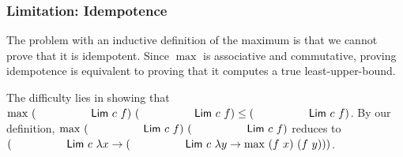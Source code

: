\begin{code}
%
\>[12]\AgdaSymbol{\{}\AgdaSpace{}%
\AgdaSymbol{:}\AgdaSpace{}%
\AgdaSymbol{\}}\<%
\\
%
\>[12]\AgdaSymbol{(}\AgdaSpace{}%
\AgdaSymbol{:}\AgdaSpace{}%
%
\>[22]\AgdaSpace{}%
\AgdaSpace{}%
\AgdaSymbol{)}\<%
\\
%
\>[12]%
\>[15]\AgdaSpace{}%
\AgdaSymbol{(}%
\>[28]\AgdaSpace{}%
\AgdaSymbol{)}\AgdaSpace{}%
\AgdaSymbol{(}%
\>[41]\AgdaSpace{}%
\AgdaSymbol{)}\AgdaSpace{}%
\AgdaSpace{}%
%
\>[55]\AgdaSpace{}%
\AgdaSpace{}%
\AgdaSpace{}%
\AgdaSpace{}%
%
\>[71]\AgdaSpace{}%
\AgdaSpace{}%
\AgdaSpace{}%
\AgdaSpace{}%
\AgdaSpace{}%
\AgdaSymbol{(}\AgdaSpace{}%
\AgdaSymbol{)}\AgdaSpace{}%
\AgdaSymbol{(}\AgdaSpace{}%
\AgdaSymbol{)))}\<%
\\
%
\>[8]\AgdaSpace{}%
\AgdaSpace{}%
\AgdaSpace{}%
\AgdaSymbol{=}\AgdaSpace{}%
%
\>[37]\AgdaSymbol{\AgdaUnderscore{}}\AgdaSpace{}%
\AgdaSymbol{\AgdaUnderscore{}}\AgdaSpace{}%
\AgdaSpace{}%
\AgdaSpace{}%
\AgdaSpace{}%
%
\>[62]\AgdaSymbol{\AgdaUnderscore{}}\AgdaSpace{}%
\AgdaSymbol{(}\AgdaSpace{}%
\AgdaSymbol{))}\<%
\end{code}


\subsubsection{Limitation: Idempotence}

The problem with an inductive definition of the maximum
is that we cannot prove that it is idempotent. Since $\max$ is associative
and commutative, proving idempotence is equivalent to proving that it computes
a true least-upper-bound.

The difficulty lies in showing that
$\max\ (\Lim\ c\ f)\ (\Lim\ c\ f)\le (\Lim\ c\ f)$.
By our definition, $\max\ (\Lim\ c\ f)\ (\Lim\ c\ f)$
reduces to $(\Lim\ c\ \lambda x \to (\Lim\ c\ \lambda y \to \max\ (f\ x)\ (f\ y)))$.
